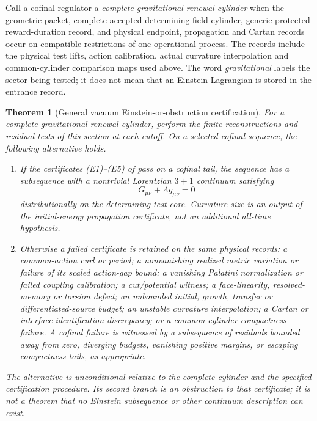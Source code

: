 \documentclass[11pt]{article}
\newtheorem{theorem}{Theorem}[section]
\theoremstyle{definition}
\theoremstyle{remark}
\begin{document}
Call a cofinal regulator a \emph{complete gravitational renewal cylinder} when
the geometric packet, complete accepted determining-field cylinder, generic
protected reward-duration record, and physical endpoint, propagation and
Cartan records occur on compatible restrictions of one operational process.
The records include the physical test lifts, action calibration, actual
curvature interpolation and common-cylinder comparison maps used above.
The word \emph{gravitational} labels the sector being tested; it does not mean
that an Einstein Lagrangian is stored in the entrance record.

\begin{theorem}[General vacuum Einstein-or-obstruction certification]
\label{thm:main-einstein-alternative}
For a complete gravitational renewal cylinder, perform the finite
reconstructions and residual tests of this section at each cutoff.  On a
selected cofinal sequence, the following alternative holds.
\begin{enumerate}[label=\textup{(A\arabic*)},leftmargin=3em]
\item If the certificates \textup{(E1)--(E5)} of
       pass on a cofinal tail, the sequence has
      a subsequence with a nontrivial Lorentzian $3+1$ continuum satisfying
      \begin{equation}
       \boxed{G_{\mu\nu}+\Lambda g_{\mu\nu}=0}
       \label{eq:main-global-vacuum-einstein}
      \end{equation}
      distributionally on the determining test core.  Curvature size is an
      output of the initial-energy propagation certificate, not an additional
      all-time hypothesis.
\item Otherwise a failed certificate is retained on the same physical records:
      a common-action curl or period; a nonvanishing realized metric variation
      or failure of its scaled action-gap bound; a vanishing Palatini
      normalization or failed coupling calibration; a cut/potential witness;
      a face-linearity, resolved-memory or torsion defect; an unbounded initial,
      growth, transfer or differentiated-source budget; an unstable curvature
      interpolation; a Cartan or interface-identification discrepancy; or a
      common-cylinder compactness failure.  A cofinal failure is witnessed by
      a subsequence of residuals bounded away from zero, diverging budgets,
      vanishing positive margins, or escaping compactness tails, as appropriate.
\end{enumerate}
The alternative is unconditional relative to the complete cylinder and the
specified certification procedure.  Its second branch is an obstruction to
that certificate; it is not a theorem that no Einstein subsequence or other
continuum description can exist.
\end{theorem}
\end{document}
